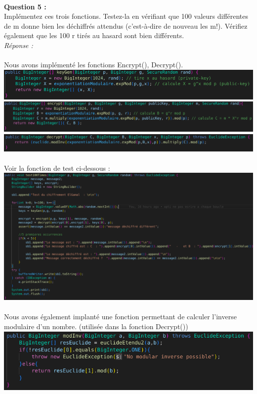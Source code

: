 \documentclass[a4paper,11pt]{article}
\begin{document}
        \textbf{\\Question 5 : \\}Implémentez ces trois fonctions. Testez-la en vérifiant que 100 valeurs différentes de m donne bien les déchiffrés attendus (c’est-à-dire de nouveau les m!). Vérifiez également que les 100 r tirés au hasard sont bien différents.
        \textit{\\Réponse :} \\\\Nous avons implémenté les fonctions Encrypt(), Decrypt().\\\includegraphics[scale=0.45]{assets/keygenEG.png}\\\includegraphics[scale=0.42]{assets/encryptEG.png}\\\includegraphics[scale=0.4]{assets/decryptEG.png} \\\\Voir la fonction de test ci-dessous : \\\includegraphics[scale=0.3]{assets/testElgamal.png}
        \\\\Nous avons également implanté une fonction permettant de calculer l'inverse modulaire d'un nombre. (utilisée dans la fonction Decrypt()) \\\includegraphics[scale=0.45]{assets/invMod.png}\\
\end{document}

